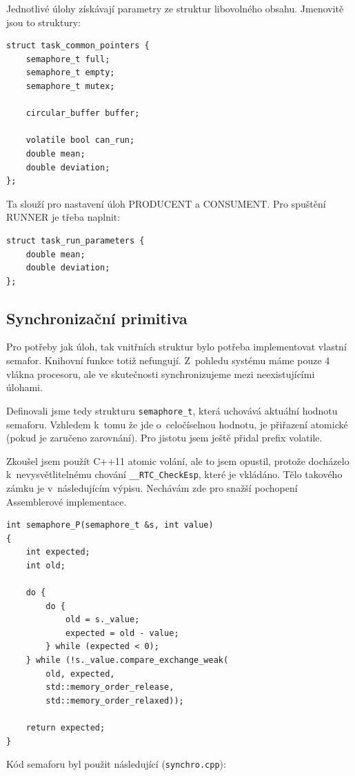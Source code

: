 \documentclass[a4paper,12pt]{article}
\begin{document}
Jednotlivé úlohy získávají parametry ze struktur libovolného obsahu. Jmenovitě
jsou to struktury:

\begin{lstlisting}
struct task_common_pointers {
	semaphore_t full;
	semaphore_t empty;
	semaphore_t mutex;

	circular_buffer buffer;

	volatile bool can_run;
	double mean;
	double deviation;
};
\end{lstlisting}

Ta slouží pro nastavení úloh PRODUCENT a CONSUMENT. Pro spuštění RUNNER je třeba naplnit:

\begin{lstlisting}
struct task_run_parameters {
	double mean;
	double deviation;
};
\end{lstlisting}

\subsection{Synchronizační primitiva}
Pro potřeby jak úloh, tak vnitřních struktur bylo potřeba implementovat vlastní
semafor. Knihovní funkce totiž nefungují. Z~pohledu systému máme pouze 4 vlákna
procesoru, ale ve skutečnosti synchronizujeme mezi neexistujícími úlohami.

Definovali jsme tedy strukturu \texttt{semaphore\_t}, která uchovává aktuální hodnotu
semaforu. Vzhledem k~tomu že jde o~celočíselnou hodnotu, je přiřazení atomické (pokud je
zaručeno zarovnání). Pro jistotu jsem ještě přidal prefix volatile.

Zkoušel jsem použít C++11 atomic volání, ale to jsem opustil, protože docházelo
k~nevysvětlitelnému chování \verb+__RTC_CheckEsp+, které je vkládáno. Tělo takového
zámku je v~následujícím výpisu. Nechávám zde pro snažší pochopení Assemblerové
implementace.

\begin{lstlisting}
int semaphore_P(semaphore_t &s, int value)
{
	int expected;
	int old;

	do {
		do {
			old = s._value;
			expected = old - value;
		} while (expected < 0);
	} while (!s._value.compare_exchange_weak(
		old, expected,
		std::memory_order_release,
		std::memory_order_relaxed));

	return expected;
}
\end{lstlisting}

Kód semaforu byl použit následující (\texttt{synchro.cpp}):

\end{document}
